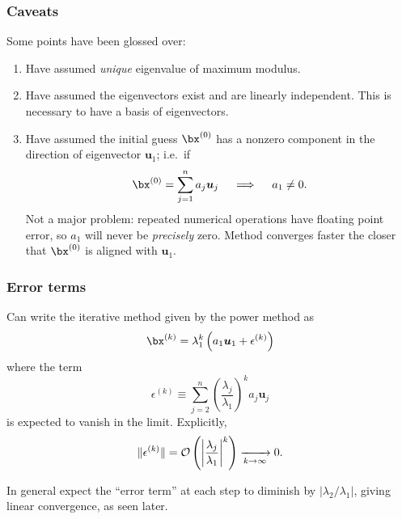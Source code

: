 \documentclass{beamer}
\newcommand{\bfm}[1]{{\boldsymbol{#1}}}
\begin{document}
\begin{frame}
  \frametitle{Caveats}

  Some points have been glossed over:
  \begin{enumerate}
  \item Have assumed \emph{unique} eigenvalue of maximum
    modulus. \pause
  \item Have assumed the eigenvectors exist and are linearly
    independent. \pause This is necessary to have a
    basis of eigenvectors. \pause
  \item Have assumed the initial guess $\bx^{(0)}$ has a nonzero
    component in the direction of eigenvector $\bfm{u}_1$; i.e.\
    if
    \begin{equation*}
      \bx^{(0)} = \sum_{j=1}^n a_j \bfm{u}_j \quad \implies \quad a_1 \neq 0.
    \end{equation*} \pause
    Not a major problem: repeated numerical operations have floating
    point error, so $a_1$ will never be \emph{precisely} zero.  Method
    converges faster the closer that $\bx^{(0)}$ is aligned with
    $\bfm{u}_1$.
  \end{enumerate}

\end{frame}

\begin{frame}
  \frametitle{Error terms}

  Can write the iterative method given by the power method as
  \begin{equation*}
    \bx^{(k)} = \lambda_1^k \left( a_1 \bfm{u}_1 + \epsilon^{(k)} \right)
  \end{equation*}
  where the term
  \begin{equation*}
    \epsilon^{(k)} \equiv \sum_{j=2}^n \left(
      \frac{\lambda_j}{\lambda_1} \right)^k a_j \bfm{u}_j
  \end{equation*}
  is expected to vanish in the limit. \pause Explicitly,
   \begin{equation*}
     \| \epsilon^{(k)} \| = {\cal O} \left( \left|
       \frac{\lambda_j}{\lambda_1} \right|^k \right)
   \xrightarrow[k \rightarrow \infty]{} 0.
   \end{equation*} \pause

   \vspace{1ex}

   In general expect the ``error term'' at each step to diminish by
   $|\lambda_2 / \lambda_1|$, giving linear convergence, as seen
   later.

\end{frame}
\end{document}
